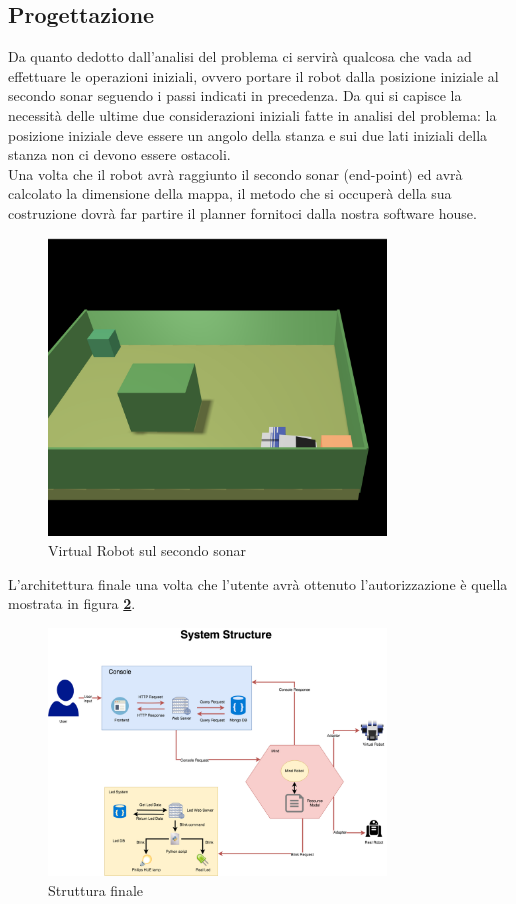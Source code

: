 \documentclass{llncs}
\begin{document}
\subsection{Progettazione}
\label{ProgettRazioneReq5}
Da quanto dedotto dall'analisi del problema ci servir\`a qualcosa che vada ad effettuare le operazioni iniziali, ovvero portare il robot dalla posizione iniziale al secondo sonar seguendo i passi indicati in precedenza. Da qui si capisce la necessit\`a delle ultime due considerazioni iniziali fatte in analisi del problema: la posizione iniziale deve essere un angolo della stanza e sui due lati iniziali della stanza non ci devono essere ostacoli.\\
Una volta che il robot avr\`a raggiunto il secondo sonar (end-point) ed avr\`a calcolato la dimensione della mappa, il metodo che si occuper\`a della sua costruzione dovr\`a far partire il planner fornitoci dalla nostra software house.
\begin{figure}
    \centering
    \includegraphics[width=0.8\textwidth]{Immagini/Requisito5/SecondSonarVirtual.png}
    \caption{Virtual Robot sul secondo sonar}
    \label{fig:R5VirtualOnSecondSonar}
\end{figure}
L'architettura finale una volta che l'utente avr\`a ottenuto l'autorizzazione \`e quella mostrata in figura \textbf{\hyperref[fig:finalstructure]{\ref{fig:finalstructure}}}.
\begin{figure}
    \centering
    \includegraphics[width=0.8\textwidth]{Immagini/Requisito5/SystemStructure.png}
    \caption{Struttura finale}
    \label{fig:finalstructure}
\end{figure}
\end{document}
